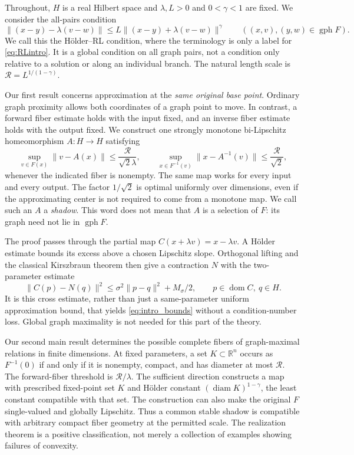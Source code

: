 \documentclass[11pt]{article}
\numberwithin{equation}{section}
\theoremstyle{definition}
\theoremstyle{remark}
\newcommand{\R}{\mathbb R}
\newcommand{\gph}{\operatorname{gph}}
\newcommand{\dom}{\operatorname{dom}}
\newcommand{\diam}{\operatorname{diam}}
\newcommand{\rad}{\mathcal R}
\newcommand{\norm}[1]{\lVert #1\rVert}
\begin{document}
Throughout, $H$ is a real Hilbert space and $\lambda,L>0$ and
$0<\gamma<1$ are fixed. We consider the all-pairs condition
\begin{equation}\label{eq:RLintro}
 \norm{(x-y)-\lambda(v-w)}
 \le L\norm{(x-y)+\lambda(v-w)}^\gamma
 \qquad ((x,v),(y,w)\in\gph F).
\end{equation}
We call this the H\"older--RL condition, where the terminology is only a
label for \eqref{eq:RLintro}. It is a global condition on all graph pairs,
not a condition only relative to a solution or along an individual branch.
The natural length scale is $\rad=L^{1/(1-\gamma)}$.

Our first result concerns approximation at the \emph{same original base
point}. Ordinary graph proximity allows both coordinates of a graph point
to move. In contrast, a forward fiber estimate holds with the input fixed,
and an inverse fiber estimate holds with the output fixed. We construct
one strongly monotone bi-Lipschitz homeomorphism $A:H\to H$ satisfying
\begin{equation}\label{eq:intro_bounds}
 \sup_{v\in F(x)}\norm{v-A(x)}\le\frac{\rad}{\sqrt2\lambda},
 \qquad
 \sup_{x\in F^{-1}(v)}\norm{x-A^{-1}(v)}\le\frac{\rad}{\sqrt2},
\end{equation}
whenever the indicated fiber is nonempty. The same map works for every
input and every output. The factor $1/\sqrt2$ is optimal uniformly over
dimensions, even if the approximating center is not required to come from
a monotone map. We call such an $A$ a \emph{shadow}. This word does not mean
that $A$ is a selection of $F$: its graph need not lie in $\gph F$.

The proof passes through the partial map
$C(x+\lambda v)=x-\lambda v$. A H\"older estimate bounds its excess above
a chosen Lipschitz slope. Orthogonal lifting and the classical
Kirszbraun theorem then give a contraction $N$ with the two-parameter
estimate
\[
 \norm{C(p)-N(q)}^2
 \le \sigma^2\norm{p-q}^2+M_\sigma/2,
 \qquad p\in\dom C,\ q\in H.
\]
It is this cross estimate, rather than just a same-parameter uniform
approximation bound, that yields \eqref{eq:intro_bounds} without a
condition-number loss. Global graph maximality is not needed for this
part of the theory.

Our second main result determines the possible complete fibers of
graph-maximal relations in finite dimensions. At fixed parameters, a set
$K\subset\R^n$ occurs as $F^{-1}(0)$ if and only if it is nonempty,
compact, and has diameter at most $\rad$. The forward-fiber threshold is
$\rad/\lambda$. The sufficient direction constructs a map with prescribed
fixed-point set $K$ and H\"older constant $(\diam K)^{1-\gamma}$, the least
constant compatible with that set. The construction can also make the
original $F$ single-valued and globally Lipschitz. Thus a common stable
shadow is compatible with arbitrary compact fiber geometry at the
permitted scale. The realization theorem is a positive classification,
not merely a collection of examples showing failures of convexity.
\end{document}
